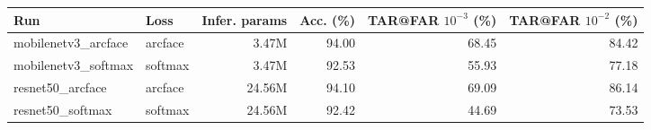 \begin{tabular}{llrrrr}
\toprule
Run & Loss & Infer. params & Acc. (\%) & TAR@FAR $10^{-3}$ (\%) & TAR@FAR $10^{-2}$ (\%) \\
\midrule
mobilenetv3\_arcface & arcface & 3.47M & 94.00 & 68.45 & 84.42 \\
mobilenetv3\_softmax & softmax & 3.47M & 92.53 & 55.93 & 77.18 \\
resnet50\_arcface & arcface & 24.56M & 94.10 & 69.09 & 86.14 \\
resnet50\_softmax & softmax & 24.56M & 92.42 & 44.69 & 73.53 \\
\bottomrule
\end{tabular}
